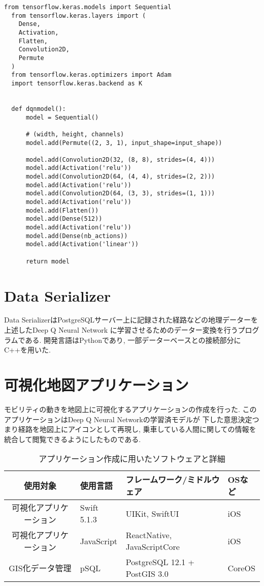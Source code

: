 \begin{lstlisting}[caption = DQNの深層学習部分を形成するモデル, label = program1]
  from tensorflow.keras.models import Sequential
  from tensorflow.keras.layers import (
    Dense,
    Activation,
    Flatten,
    Convolution2D,
    Permute
  )
  from tensorflow.keras.optimizers import Adam
  import tensorflow.keras.backend as K
  
  
  def dqnmodel():
      model = Sequential()
  
      # (width, height, channels)
      model.add(Permute((2, 3, 1), input_shape=input_shape))
  
      model.add(Convolution2D(32, (8, 8), strides=(4, 4)))
      model.add(Activation('relu'))
      model.add(Convolution2D(64, (4, 4), strides=(2, 2)))
      model.add(Activation('relu'))
      model.add(Convolution2D(64, (3, 3), strides=(1, 1)))
      model.add(Activation('relu'))
      model.add(Flatten())
      model.add(Dense(512))
      model.add(Activation('relu'))
      model.add(Dense(nb_actions))
      model.add(Activation('linear'))
  
      return model  
\end{lstlisting}
  
  

\section{Data Serializer}

Data SerializerはPostgreSQLサーバー上に記録された経路などの地理データーを上述したDeep Q Neural Network
に学習させるためのデーター変換を行うプログラムである.
開発言語はPythonであり, 一部データーベースとの接続部分にC++を用いた.


\section{可視化地図アプリケーション}

モビリティの動きを地図上に可視化するアプリケーションの作成を行った. このアプリケーションはDeep Q Neural Networkの学習済モデルが
下した意思決定つまり経路を地図上にアイコンとして再現し, 乗車している人間に関しての情報を統合して閲覧できるようにしたものである.


\begin{table}[h]
  \caption{アプリケーション作成に用いたソフトウェアと詳細}
  \label{table:SpeedOfLight}
  \centering
  \begin{tabular}{clll}
    \hline
      使用対象 & 使用言語 & フレームワーク/ミドルウェア & OSなど \\
      \hline \hline
      可視化アプリケーション & Swift 5.1.3 & UIKit, SwiftUI & iOS \\
      可視化アプリケーション & JavaScript & ReactNative, JavaScriptCore & iOS \\
      GIS化データ管理 & pSQL & PostgreSQL 12.1 + PostGIS 3.0 & CoreOS \\
    \hline
  \end{tabular}
\end{table}


